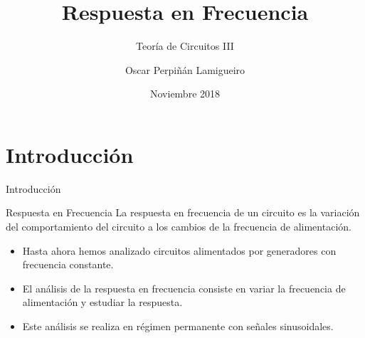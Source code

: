 \documentclass[xcolor={usenames,svgnames,dvipsnames}]{beamer}
\author{Oscar Perpiñán Lamigueiro}
\date{Noviembre 2018}
\title{Respuesta en Frecuencia}
\subtitle{Teoría de Circuitos III}
\begin{document}
\maketitle

\section{Introducción}
\label{sec:org6edc6b6}
\begin{frame}[label={sec:orgd5fe243}]{Introducción}
\begin{block}{Respuesta en Frecuencia}
La respuesta en frecuencia de un circuito es la variación del comportamiento del circuito a los cambios de la frecuencia de alimentación.
\end{block}

\begin{itemize}
\item Hasta ahora hemos analizado circuitos alimentados por generadores con frecuencia constante.
\item El análisis de la \alert{respuesta en frecuencia} consiste en variar la frecuencia de alimentación y estudiar la respuesta.
\item Este análisis se realiza en \alert{régimen permanente} con señales sinusoidales.
\end{itemize}
\end{frame}
\end{document}
